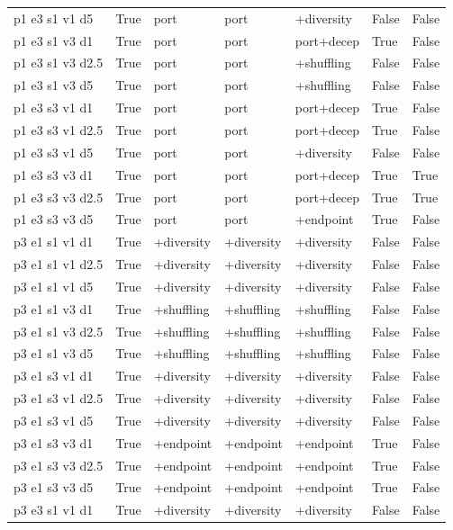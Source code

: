 \begin{table}[t]
\begin{tabular}{lllllll}
p1 e3 s1 v1 d5 & True & port & port & +diversity & False & False \\
p1 e3 s1 v3 d1 & True & port & port & port+decep & True & False \\
p1 e3 s1 v3 d2.5 & True & port & port & +shuffling & False & False \\
p1 e3 s1 v3 d5 & True & port & port & +shuffling & False & False \\
p1 e3 s3 v1 d1 & True & port & port & port+decep & True & False \\
p1 e3 s3 v1 d2.5 & True & port & port & port+decep & True & False \\
p1 e3 s3 v1 d5 & True & port & port & +diversity & False & False \\
p1 e3 s3 v3 d1 & True & port & port & port+decep & True & True \\
p1 e3 s3 v3 d2.5 & True & port & port & port+decep & True & True \\
p1 e3 s3 v3 d5 & True & port & port & +endpoint & True & False \\
p3 e1 s1 v1 d1 & True & +diversity & +diversity & +diversity & False & False \\
p3 e1 s1 v1 d2.5 & True & +diversity & +diversity & +diversity & False & False \\
p3 e1 s1 v1 d5 & True & +diversity & +diversity & +diversity & False & False \\
p3 e1 s1 v3 d1 & True & +shuffling & +shuffling & +shuffling & False & False \\
p3 e1 s1 v3 d2.5 & True & +shuffling & +shuffling & +shuffling & False & False \\
p3 e1 s1 v3 d5 & True & +shuffling & +shuffling & +shuffling & False & False \\
p3 e1 s3 v1 d1 & True & +diversity & +diversity & +diversity & False & False \\
p3 e1 s3 v1 d2.5 & True & +diversity & +diversity & +diversity & False & False \\
p3 e1 s3 v1 d5 & True & +diversity & +diversity & +diversity & False & False \\
p3 e1 s3 v3 d1 & True & +endpoint & +endpoint & +endpoint & True & False \\
p3 e1 s3 v3 d2.5 & True & +endpoint & +endpoint & +endpoint & True & False \\
p3 e1 s3 v3 d5 & True & +endpoint & +endpoint & +endpoint & True & False \\
p3 e3 s1 v1 d1 & True & +diversity & +diversity & +diversity & False & False \\

\end{tabular}
\end{table}
